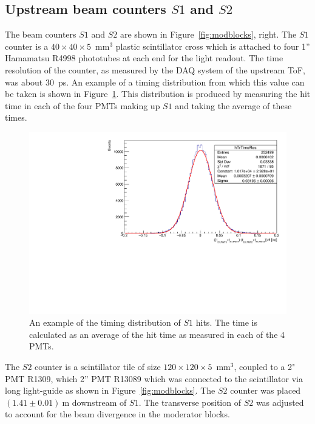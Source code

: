 \subsection{Upstream beam counters $\mathit{S1}$ and $\mathit{S2}$}
\label{subsec:s1s2Exp}
The beam counters $\mathit{S1}$ and $\mathit{S2}$ are shown in Figure~\ref{fig:modblocks}, right.
The $\mathit{S1}$ counter is a $40\times40\times5$~mm$^3$ plastic scintillator cross which is attached to four 1'' Hamamatsu R4998 phototubes at each end for the light readout.
The time resolution of the counter, as measured by the DAQ system of the upstream ToF, was about 30~ps.
An example of a timing distribution from which this value can be taken is shown in Figure~\ref{fig:s3Res}.
This distribution is produced by measuring the hit time in each of the four PMTs making up $\mathit{S1}$ and taking the average of these times.
\begin{figure}
  \centering
  \includegraphics[width=0.65\linewidth]{files/Figures/TrTimeRes.pdf}
  \caption{An example of the timing distribution of $\mathit{S1}$ hits. The time is calculated as an average of the hit time as measured in each of the 4 PMTs.}
  \label{fig:s3Res}
\end{figure}


The $\mathit{S2}$ counter is a scintillator tile of size $120\times120\times5$~mm$^3$, coupled to a 2" PMT R1309, which  2'' PMT R13089 which was connected to the scintillator via long light-guide as shown in Figure~\ref{fig:modblocks}.
The $\mathit{S2}$ counter was placed $(1.41 \pm 0.01)~\text{m}$  downstream of $\mathit{S1}$.
The transverse position of $\mathit{S2}$ was adjusted to account for the beam divergence in the moderator blocks.

